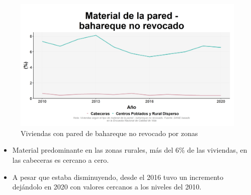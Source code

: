     \begin{figure}[H]
        \caption{Viviendas con pared de bahareque no revocado por zonas \label{map_result_2} }
        \begin{center}
        \includegraphics[width=\textwidth,keepaspectratio]{img/var_153_trend.png}
        \end{center}
    \end{figure}
            \begin{itemize}
                    \item Material predominante en las zonas rurales, más del 6\% de las viviendas, en las cabeceras es cercano a cero.
                    \item A pesar que estaba disminuyendo, desde el 2016 tuvo un incremento dejándolo en 2020 con valores cercanos a los niveles del 2010.
                    \end{itemize}

